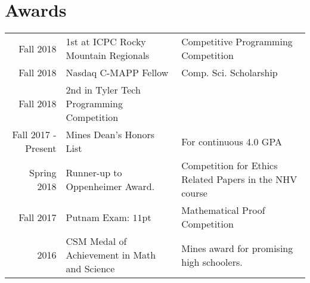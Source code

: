 \documentclass[]{deedy-resume-openfont}
\begin{document}
\begin{minipage}[t]{0.55\textwidth}

%
%

\end{minipage} 


\section{Awards} 
\begin{tabular}{rll}
Fall 2018 & 1st at ICPC Rocky Mountain Regionals & Competitive Programming Competition \\
Fall 2018 & Nasdaq C-MAPP Fellow & Comp. Sci. Scholarship \\
Fall 2018 & 2nd in Tyler Tech Programming Competition & \\
Fall 2017 - Present & Mines Dean's Honors List & For continuous 4.0 GPA \\
Spring 2018 & Runner-up to Oppenheimer Award. & Competition for Ethics Related Papers in the NHV course \\
Fall 2017 & Putnam Exam: \(11\)pt & Mathematical Proof Competition \\
2016	     & CSM Medal of Achievement in Math and Science & Mines award for promising high schoolers. \\
\end{tabular}
\end{document}
